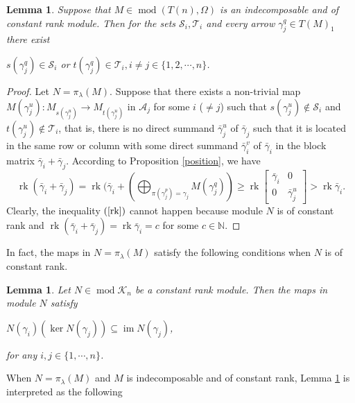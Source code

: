 \documentclass[a4paper,12pt]{amsart}
\newcommand{\cA}{\mathcal{A}}
\newcommand{\bg}{\bar{\gamma}}
\newcommand{\cK}{\mathcal{K}}
\newcommand{\cT}{\mathcal{T}}
\newcommand{\cS}{\mathcal{S}}
\DeclareMathOperator{\rk}{rk}
\DeclareMathOperator{\modd}{mod}
\DeclareMathOperator{\im}{im}
\newtheorem{Lemma}[proposition]{Lemma}
\begin{document}
\begin{Lemma}\label{ddpoint}
Suppose that $M\in \modd(T(n),\Omega)$ is an  indecomposable and of constant rank module. Then  for the sets $\cS_i, \cT_i$ and every arrow $\gamma^q_j\in T(M)_1$ there exist
\begin{center}
$ s(\gamma^{q}_j)\in \cS_i$ or  $t(\gamma^{q}_j)\in \cT_i, i\neq j\in\{1,2,\cdots,n\}$.
\end{center}





\end{Lemma}
\begin{proof}
Let  $N=\pi_\lambda{(M)}$.   Suppose that there exists a non-trivial map  $M(\gamma^u_j): M_{s(\gamma^u_j)} \rightarrow M_{t(\gamma^u_j)}$  in $\cA_j$ for some  $i$ ($\neq j$) such that $s(\gamma^u_j)\nin \cS_i$ and $t(\gamma^u_j)\nin \cT_i$, that is, there is no   direct summand  $\bg^u_j$ of $\bg_j$ such that it is located in the same row or column with some direct summand $\bg^v_i$ of $\bg_i$ in the block matrix $\bg_i+\bg_j$.  According to Proposition \ref{position}, we have
\begin{equation}\label{rk}
\rk(\bg_i+\bg_j)=\rk(\bg_i+(\bigoplus_{\pi(\gamma^p_j)=\gamma_j} M(\gamma^q_j))\geq \rk \begin{bmatrix}
\bg_i & 0\\
0& \bg^u_j
\end{bmatrix}>\rk \bg_i.
\end{equation}
Clearly, the inequality $(\ref{rk})$ cannot happen because module $N$ is of constant rank and  $\rk(\bg_i+\bg_j) = \rk \bg_i=c$ for some $c\in \mathbb{N}$.
\end{proof}

In fact, the maps in $N=\pi_\lambda(M)$ satisfy the following conditions when $N$ is of constant rank.

\begin{Lemma}\cite[Lemma 3.1]{West}\label{KI} Let $N\in \modd\cK_n$ be a constant rank module. Then the maps in module $N$ satisfy 

\begin{center}
$N(\gamma_i)(\ker N(\gamma_j))\subseteq \im N(\gamma_j)$,
\end{center}
for any $i,j\in \{1,\cdots,n\}$.
\end{Lemma}

When $N=\pi_\lambda(M)$ and $M$ is indecomposable and of constant rank, Lemma \ref{KI} is interpreted as  the following 
\end{document}
